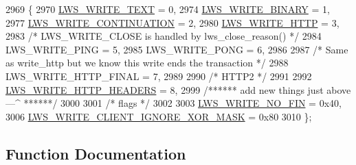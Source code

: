 \begin{DoxyCode}
2969                         \{
2970         \hyperlink{group__sending-data_gga98b099cf8c1c7e38ad78501f270e193da80e8f169fda236c56bfb795ed62903db}{LWS\_WRITE\_TEXT}                                            = 0,
2974         \hyperlink{group__sending-data_gga98b099cf8c1c7e38ad78501f270e193daf6486c0dba50c44198100717721d9ab2}{LWS\_WRITE\_BINARY}                                        = 1,
2977         \hyperlink{group__sending-data_gga98b099cf8c1c7e38ad78501f270e193da10047eb05b5e1c298151dc47a5b44826}{LWS\_WRITE\_CONTINUATION}                                    = 2,
2980         \hyperlink{group__sending-data_gga98b099cf8c1c7e38ad78501f270e193dabb6705e1d1327cdda5025be28f07712e}{LWS\_WRITE\_HTTP}                                            = 3,
2983         \textcolor{comment}{/* LWS\_WRITE\_CLOSE is handled by lws\_close\_reason() */}
2984         LWS\_WRITE\_PING                                          = 5,
2985         LWS\_WRITE\_PONG                                          = 6,
2986 
2987         \textcolor{comment}{/* Same as write\_http but we know this write ends the transaction */}
2988         LWS\_WRITE\_HTTP\_FINAL                                    = 7,
2989 
2990         \textcolor{comment}{/* HTTP2 */}
2991 
2992         \hyperlink{group__sending-data_gga98b099cf8c1c7e38ad78501f270e193dafe5a38e940ce56708ac814627e9c0917}{LWS\_WRITE\_HTTP\_HEADERS}                                    = 8,
2999         \textcolor{comment}{/****** add new things just above ---^ ******/}
3000 
3001         \textcolor{comment}{/* flags */}
3002 
3003         \hyperlink{group__sending-data_gga98b099cf8c1c7e38ad78501f270e193da115440f272a5d55518adfc8099acfee3}{LWS\_WRITE\_NO\_FIN} = 0x40,
3006         \hyperlink{group__sending-data_gga98b099cf8c1c7e38ad78501f270e193da220d8e8652d9b97fb66e476e2a60ffce}{LWS\_WRITE\_CLIENT\_IGNORE\_XOR\_MASK} = 0x80
3010 \};
\end{DoxyCode}


\subsection{Function Documentation}
